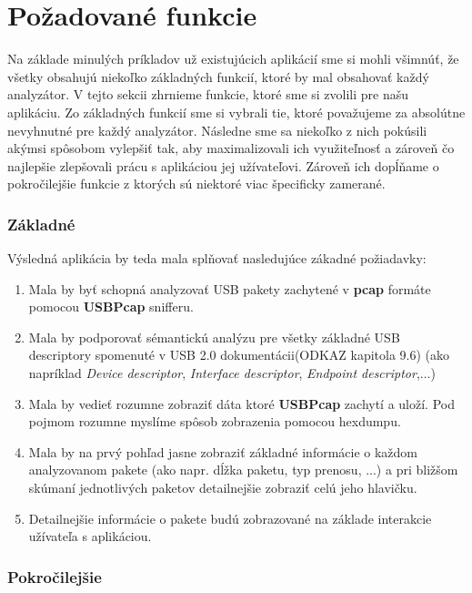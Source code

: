 \section{Požadované funkcie}
Na základe minulých príkladov už existujúcich aplikácií sme si mohli všimnúť, že všetky obsahujú niekoľko základných funkcií, ktoré by mal obsahovať každý analyzátor. V tejto sekcii zhrnieme funkcie, ktoré sme si zvolili pre našu aplikáciu. Zo základných funkcií sme si vybrali tie, ktoré považujeme za absolútne nevyhnutné pre každý analyzátor. Následne sme sa niekoľko z nich pokúsili akýmsi spôsobom vylepšiť tak, aby maximalizovali ich využiteľnosť a zároveň čo najlepšie zlepšovali prácu s aplikáciou jej užívateľovi. Zároveň ich dopĺňame o pokročilejšie funkcie z ktorých sú niektoré viac špecificky zamerané.

\subsubsection*{Základné}

Výsledná aplikácia by teda mala splňovať nasledujúce zákadné požiadavky:

\begin{enumerate}[label=\textbf{P\arabic*}]
	\item Mala by byť schopná analyzovať USB pakety zachytené v \textbf{pcap} formáte pomocou \textbf{USBPcap} snifferu.
	\item Mala by podporovať sémantickú analýzu pre všetky základné USB descriptory spomenuté v USB 2.0 dokumentácii(ODKAZ kapitola 9.6) (ako napríklad \textit{Device descriptor}, \textit{Interface descriptor}, \textit{Endpoint descriptor},...)
	\item Mala by vedieť rozumne zobraziť dáta ktoré \textbf{USBPcap} zachytí a uloží. Pod pojmom rozumne myslíme spôsob zobrazenia pomocou hexdumpu.
	\item Mala by na prvý pohľad jasne zobraziť základné informácie o každom analyzovanom pakete (ako napr. dĺžka paketu, typ prenosu, ...) a pri bližšom skúmaní jednotlivých paketov detailnejšie zobraziť celú jeho hlavičku.
	\item Detailnejšie informácie o pakete budú zobrazované na základe interakcie užívateľa s aplikáciou.
\end{enumerate}

\subsubsection*{Pokročilejšie}

